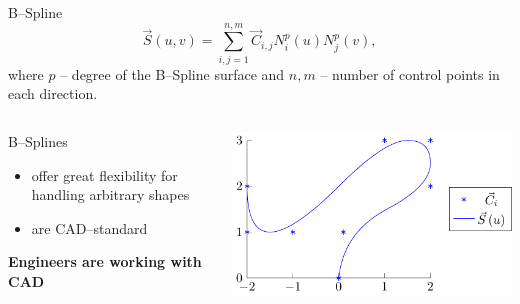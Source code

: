 \newcommand{\norm}[1]{\parallel #1 \parallel_2}
\begin{frame}{B--Spline}
\begin{equation*}
\vec{S}\left(u,v\right)=\sum\limits_{i,j=1}^{n,m} \vec{C}_{i,j} N_i^p\left(u\right) N_j^p\left(v\right),
\end{equation*}
where $p$ -- degree of the B--Spline surface and $n,m$ -- number of control points in each direction.
\begin{columns}
\begin{column}{.45\textwidth}
B--Splines
\begin{itemize}
\item offer great flexibility for handling arbitrary shapes
\item are CAD--standard
\end{itemize}
\textbf{Engineers are working with CAD}
\end{column}
\begin{column}{.45\textwidth}
\includegraphics[width=\textwidth]{Pictures/BSplineEx/example.pdf}
\end{column}
\end{columns}
\end{frame}

